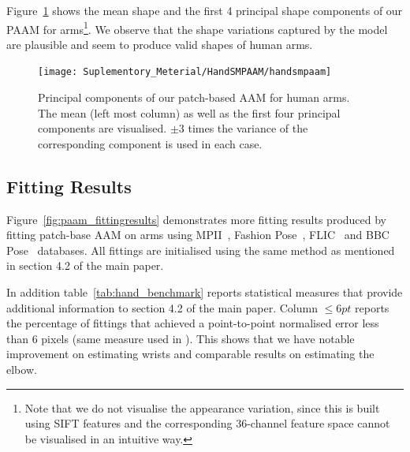 Figure~\ref{fig:paam_sm} shows the mean shape and the first 4 principal shape components of our PAAM for arms\footnote{Note that we do not visualise the appearance variation, since this is built using SIFT features and the corresponding 36-channel feature space cannot be visualised in an intuitive way.}. We observe that the shape variations captured by the model are plausible and seem to produce valid shapes of human arms.

\begin{figure}[!t]
\centering
\texttt{[image: Suplementory\_Meterial/HandSMPAAM/handsmpaam]}
\caption{Principal components of our patch-based AAM for human arms.  The mean (left most column) as well as the first four principal components are visualised. $\pm 3$ times the variance of the corresponding component is used in each case.}
\label{fig:paam_sm}
\end{figure}




\subsection{Fitting Results}
\label{sec:paam_fittingresults}


Figure~\ref{fig:paam_fittingresults} demonstrates more fitting results produced by fitting patch-base AAM on arms using MPII~\cite{andriluka14cvpr}, Fashion Pose~\cite{dantone2013human}, FLIC~\cite{sapp2013modec} and BBC Pose~\cite{pfister2015flowing} databases. All fittings are initialised using the same method as mentioned in section 4.2 of the main paper.


In addition table~\ref{tab:hand_benchmark} reports statistical measures that provide additional information to section 4.2 of the main paper. Column $\leq 6pt$ reports the percentage of fittings that achieved a point-to-point normalised error less than 6 pixels (same measure used in \cite{pfister2015flowing}). This shows that we have notable improvement on estimating wrists and comparable results on estimating the elbow.







{\small


}














